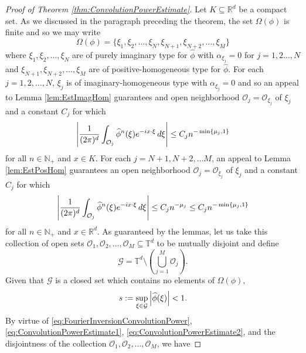 \documentclass[11pt]{article}
\begin{document}
\begin{proof}[Proof of Theorem \ref{thm:ConvolutionPowerEstimate}]
Let $K\subseteq\mathbb{R}^d$ be a compact set. As we discussed in the paragraph preceding the theorem, the set $\Omega(\phi)$ is finite and so we may write
\begin{equation*}
    \Omega(\phi)=\{\xi_1,\xi_2,\dots,\xi_N,\xi_{N+1},\xi_{N+2},\dots,\xi_M\}
\end{equation*}
where $\xi_1,\xi_2,\dots,\xi_N$ are of purely imaginary type for $\widehat{\phi}$ with $\alpha_{\xi_j}=0$ for $j=1,2\dots,N$ and $\xi_{N+1},\xi_{N+2},\dots,\xi_M$ are of positive-homogeneous type for $\widehat{\phi}$. For each $j=1,2,\dots,N$, $\xi_j$ is of imaginary-homogeneous type with $\alpha_{\xi_j}=0$ and so an appeal to Lemma \ref{lem:EstImagHom} guarantees and open neighborhood $\mathcal{O}_j=\mathcal{O}_{\xi_j}$ of $\xi_j$ and a constant $C_j$ for which
\begin{equation}\label{eq:ConvolutionPowerEstimate1}
    \abs{\frac{1}{(2\pi)^d}\int_{\mathcal{O}_j}\widehat{\phi}^n(\xi)e^{-ix\cdot\xi}\,d\xi}\leq C_j n^{-\min\{\mu_j,1\}}
\end{equation}
for all $n\in\mathbb{N}_+$ and $x\in K$. For each $j=N+1,N+2,\dots M$, an appeal to Lemma \ref{lem:EstPosHom} guarantees an open neighborhood $\mathcal{O}_j=\mathcal{O}_{\xi_j}$ of $\xi_j$ and a constant $C_j$ for which 
\begin{equation}\label{eq:ConvolutionPowerEstimate2}
        \abs{\frac{1}{(2\pi)^d}\int_{\mathcal{O}_j}\widehat{\phi}^n(\xi)e^{-ix\cdot\xi}\,d\xi}\leq C_jn^{-\mu_j}\leq C_j n^{-\min\{\mu_j,1\}}
\end{equation}
for all $n\in\mathbb{N}_+$ and $x\in\mathbb{R}^d$. As guaranteed by the lemmas, let us take this collection of open sets $\mathcal{O}_1,\mathcal{O}_2,\dots,\mathcal{O}_M\subseteq\mathbb{T}^d$ to be mutually disjoint and define
\begin{equation}
    \mathcal{G}=\mathbb{T}^d\setminus\left(\bigcup_{j=1}^M \mathcal{O}_j\right).
\end{equation}
Given that $\mathcal{G}$ is a closed set which contains no elements of $\Omega(\phi)$,
\begin{equation*}
s:=\sup_{\xi\in\mathcal{G}}\abs{\widehat{\phi}(\xi)}<1.
\end{equation*}
By virtue of \eqref{eq:FourierInversionConvolutionPower}, \eqref{eq:ConvolutionPowerEstimate1}, \eqref{eq:ConvolutionPowerEstimate2}, and the disjointness of the collection $\mathcal{O}_1,\mathcal{O}_2,\dots,\mathcal{O}_M$, we have

\end{proof}
\end{document}
